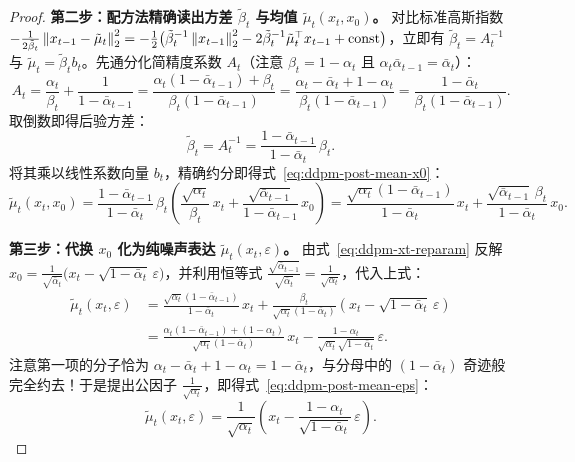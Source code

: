 \begin{thmBox}
\begin{proof}
\textbf{第二步：配方法精确读出方差 $\tilde{\beta}_t$ 与均值 $\tilde{\mu}_t(x_t, x_0)$。} 对比标准高斯指数 $-\frac{1}{2\tilde{\beta}_t}\left\|x_{t-1} - \tilde{\mu}_t\right\|_2^2 = -\frac{1}{2}\big(\tilde{\beta}_t^{-1}\left\|x_{t-1}\right\|_2^2 - 2\tilde{\beta}_t^{-1}\tilde{\mu}_t^\top x_{t-1} + \text{const}\big)$，立即有 $\tilde{\beta}_t = A_t^{-1}$ 与 $\tilde{\mu}_t = \tilde{\beta}_t b_t$。先通分化简精度系数 $A_t$（注意 $\beta_t = 1 - \alpha_t$ 且 $\alpha_t \bar{\alpha}_{t-1} = \bar{\alpha}_t$）：
\[
  A_t = \frac{\alpha_t}{\beta_t} + \frac{1}{1 - \bar{\alpha}_{t-1}}
      = \frac{\alpha_t(1 - \bar{\alpha}_{t-1}) + \beta_t}{\beta_t(1 - \bar{\alpha}_{t-1})}
      = \frac{\alpha_t - \bar{\alpha}_t + 1 - \alpha_t}{\beta_t(1 - \bar{\alpha}_{t-1})}
      = \frac{1 - \bar{\alpha}_t}{\beta_t(1 - \bar{\alpha}_{t-1})}.
\]
取倒数即得后验方差：
\[
  \tilde{\beta}_t = A_t^{-1} = \frac{1 - \bar{\alpha}_{t-1}}{1 - \bar{\alpha}_t}\,\beta_t.
\]
将其乘以线性系数向量 $b_t$，精确约分即得式~\eqref{eq:ddpm-post-mean-x0}：
\[
  \tilde{\mu}_t(x_t, x_0)
  = \frac{1 - \bar{\alpha}_{t-1}}{1 - \bar{\alpha}_t}\,\beta_t
    \left(\frac{\sqrt{\alpha_t}}{\beta_t}\, x_t + \frac{\sqrt{\bar{\alpha}_{t-1}}}{1 - \bar{\alpha}_{t-1}}\, x_0\right)
  = \frac{\sqrt{\alpha_t}(1 - \bar{\alpha}_{t-1})}{1 - \bar{\alpha}_t}\, x_t
  + \frac{\sqrt{\bar{\alpha}_{t-1}}\,\beta_t}{1 - \bar{\alpha}_t}\, x_0.
\]

\textbf{第三步：代换 $x_0$ 化为纯噪声表达 $\tilde{\mu}_t(x_t, \varepsilon)$。} 由式~\eqref{eq:ddpm-xt-reparam} 反解 $x_0 = \frac{1}{\sqrt{\bar{\alpha}_t}}\big(x_t - \sqrt{1 - \bar{\alpha}_t}\,\varepsilon\big)$，并利用恒等式 $\frac{\sqrt{\bar{\alpha}_{t-1}}}{\sqrt{\bar{\alpha}_t}} = \frac{1}{\sqrt{\alpha_t}}$，代入上式：
\begin{align*}
  \tilde{\mu}_t(x_t, \varepsilon)
  &= \frac{\sqrt{\alpha_t}(1 - \bar{\alpha}_{t-1})}{1 - \bar{\alpha}_t}\, x_t
   + \frac{\beta_t}{\sqrt{\alpha_t}(1 - \bar{\alpha}_t)}\!\left(x_t - \sqrt{1 - \bar{\alpha}_t}\,\varepsilon\right) \\
  &= \frac{\alpha_t(1 - \bar{\alpha}_{t-1}) + (1 - \alpha_t)}{\sqrt{\alpha_t}(1 - \bar{\alpha}_t)}\, x_t
   - \frac{1 - \alpha_t}{\sqrt{\alpha_t}\sqrt{1 - \bar{\alpha}_t}}\,\varepsilon.
\end{align*}
注意第一项的分子恰为 $\alpha_t - \bar{\alpha}_t + 1 - \alpha_t = 1 - \bar{\alpha}_t$，与分母中的 $(1 - \bar{\alpha}_t)$ 奇迹般完全约去！于是提出公因子 $\frac{1}{\sqrt{\alpha_t}}$，即得式~\eqref{eq:ddpm-post-mean-eps}：
\[
  \tilde{\mu}_t(x_t, \varepsilon) = \frac{1}{\sqrt{\alpha_t}}\!\left(x_t - \frac{1 - \alpha_t}{\sqrt{1 - \bar{\alpha}_t}}\,\varepsilon\right).
\]
\end{proof}
\end{thmBox}

